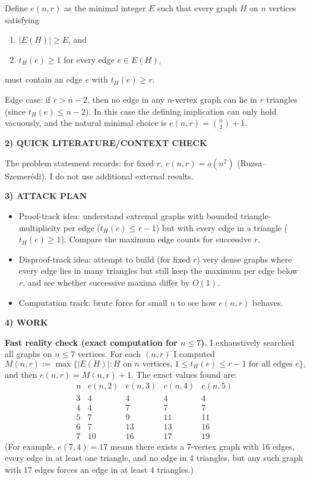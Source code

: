 Define $e(n,r)$ as the minimal integer $E$ such that every graph $H$ on $n$ vertices satisfying
\begin{enumerate}
\item $|E(H)|\ge E$, and
\item $t_H(e)\ge 1$ for every edge $e\in E(H)$,
\end{enumerate}
must contain an edge $e$ with $t_H(e)\ge r$.

Edge case: if $r>n-2$, then no edge in any $n$-vertex graph can lie in $r$ triangles (since $t_H(e)\le n-2$). In this case the defining implication can only hold vacuously, and the natural minimal choice is $e(n,r)={n\choose 2}+1$.

\noindent\textbf{2) QUICK LITERATURE/CONTEXT CHECK}\par
The problem statement records: for fixed $r$, $e(n,r)=o(n^2)$ (Ruzsa--Szemer\'{e}di). I do not use additional external results.

\noindent\textbf{3) ATTACK PLAN}\par
\begin{itemize}
\item Proof-track idea: understand extremal graphs with bounded triangle-multiplicity per edge ($t_H(e)\le r-1$) but with every edge in a triangle ($t_H(e)\ge 1$). Compare the maximum edge counts for successive $r$.
\item Disproof-track idea: attempt to build (for fixed $r$) very dense graphs where every edge lies in many triangles but still keep the maximum per edge below $r$, and see whether successive maxima differ by $O(1)$.
\item Computation track: brute force for small $n$ to see how $e(n,r)$ behaves.
\end{itemize}

\noindent\textbf{4) WORK}\par
\textbf{Fast reality check (exact computation for $n\le 7$).}
I exhaustively searched all graphs on $n\le 7$ vertices.
For each $(n,r)$ I computed
\[
M(n,r):=\max\{|E(H)|: H \text{ on } n \text{ vertices, } 1\le t_H(e)\le r-1 \text{ for all edges }e\},
\]
and then $e(n,r)=M(n,r)+1$.
The exact values found are:
\[
\begin{array}{c|cccc}
 n & e(n,2) & e(n,3) & e(n,4) & e(n,5) \\\hline
 3 & 4 & 4 & 4 & 4 \\
 4 & 4 & 7 & 7 & 7 \\
 5 & 7 & 9 & 11 & 11 \\
 6 & 7 & 13 & 13 & 16 \\
 7 & 10 & 16 & 17 & 19 
\end{array}
\]
(For example, $e(7,4)=17$ means there exists a 7-vertex graph with 16 edges, every edge in at least one triangle, and no edge in 4 triangles, but any such graph with 17 edges forces an edge in at least 4 triangles.)

